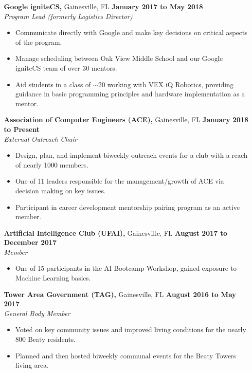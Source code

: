 \documentclass[11pt]{article} %
\begin{document}
		\vspace{.1cm}
		
		\noindent \textbf{Google igniteCS,} Gainesville, FL \hfill\textbf{January 2017 to May 2018}\\
		\textit{Program Lead (formerly Logistics Director)}
		\begin{itemize}[noitemsep,nolistsep, label = {-}]
			\item Communicate directly with Google and make key decisions on critical aspects of the program.
			\item Manage scheduling between Oak View Middle School and our Google igniteCS team of over 30 mentors.
			\item Aid students in a class of $\sim$20 working with VEX iQ Robotics, providing guidance in basic programming principles and hardware implementation as a mentor.
		\end{itemize} 
	
		\vspace{.1cm}
		
		\noindent \textbf{Association of Computer Engineers (ACE),} Gainesville, FL \hfill\textbf{January 2018 to Present}\\
		\textit{External Outreach Chair}
		\begin{itemize}[noitemsep,nolistsep, label={-}]
			\item Design, plan, and implement biweekly outreach events for a club with a reach of nearly 1000 members.
			\item One of 11 leaders responsible for the management/growth of ACE via decision making on key issues.
			\item Participant in career development mentorship pairing program as an active member.
		\end{itemize}
	
		\vspace{.1cm}
		
		\noindent \textbf{Artificial Intelligence Club (UFAI),} Gainesville, FL \hfill\textbf{August 2017 to December 2017}\\
		\textit{Member}
		\begin{itemize}[noitemsep,nolistsep, label={-}]
			\item One of 15 participants in the AI Bootcamp Workshop, gained exposure to Machine Learning basics.
		\end{itemize}
		
		\vspace{.1cm}
		
		\noindent \textbf{Tower Area Government (TAG),} Gainesville, FL \hfill\textbf{August 2016 to May 2017}\\
		\textit{General Body Member}
		\begin{itemize}[noitemsep,nolistsep, label={-}]
			\item Voted on key community issues and improved living conditions for the nearly 800 Beaty residents.
			\item Planned and then hosted biweekly communal events for the Beaty Towers living area.
		\end{itemize}
		
\end{document}

